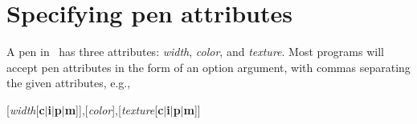 \section{Specifying pen attributes}

%
%
\label{sec:pen}
A pen in \GMT\ has three attributes: \emph{width}, \emph{color},
and \emph{texture}.  Most programs will accept pen attributes in
the form of an option argument, with commas separating the
given attributes, e.g.,

\vspace{\baselineskip} 

\par {}[\emph{width}[\textbf{c$|$i$|$p$|$m}]],[\emph{color}],[\emph{texture}[\textbf{c$|$i$|$p$|$m}]]\par 

